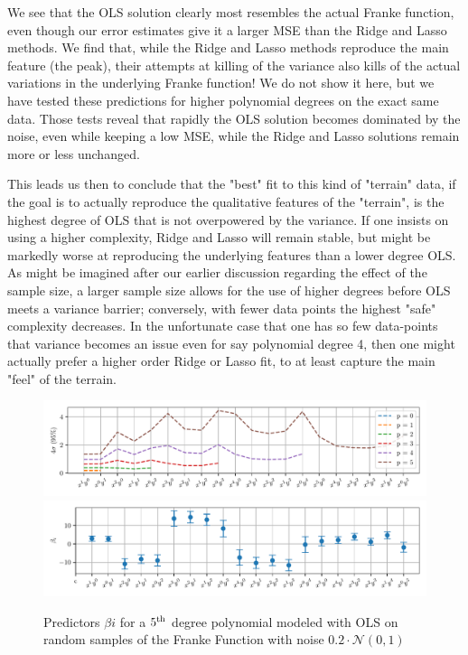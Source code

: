 \documentclass[reprint, english, nofootinbib]{revtex4-2}
\begin{document}
We see that the OLS solution clearly most resembles the actual Franke function, even though our error estimates give it a larger MSE than the Ridge and Lasso methods. We find that, while the Ridge and Lasso methods reproduce the main feature (the peak), their attempts at killing of the variance also kills of the actual variations in the underlying Franke function! We do not show it here, but we have tested these predictions for higher polynomial degrees on the exact same data. Those tests reveal that rapidly the OLS solution becomes dominated by the noise, even while keeping a low MSE, while the Ridge and Lasso solutions remain more or less unchanged.

This leads us then to conclude that the "best" fit to this kind of "terrain" data, if the goal is to actually reproduce the qualitative features of the "terrain", is the highest degree of OLS that is not overpowered by the variance. If one insists on using a higher complexity, Ridge and Lasso will remain stable, but might be markedly worse at reproducing the underlying features than a lower degree OLS. As might be imagined after our earlier discussion regarding the effect of the sample size, a larger sample size allows for the use of higher degrees before OLS meets a variance barrier; conversely, with fewer data points the highest "safe" complexity decreases. In the unfortunate case that one has so few data-points that variance becomes an issue even for say polynomial degree 4, then one might actually prefer a higher order Ridge or Lasso fit, to at least capture the main "feel" of the terrain.



\begin{figure}
    \centering
    \includegraphics[width=2\columnwidth]{beta_confidence_interval_size_OLS.pdf}
    \includegraphics[width=2\columnwidth]{beta_confidence_interval_OLS.pdf}
    \caption{\label{fig:confidence intervals}Predictors $\beta{i}$ for a $5^{\textup{th}}$ degree polynomial modeled with OLS on random samples of the Franke Function with noise $0.2\cdot\mathcal{N}(0, 1)$}
\end{figure}
\end{document}
